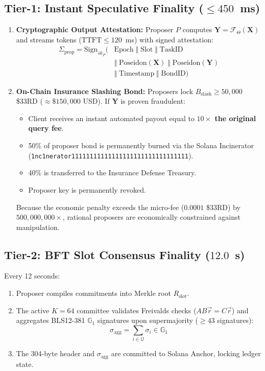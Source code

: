 \documentclass[10pt,twocolumn,letterpaper]{article}
\begin{document}
\subsection{Tier-1: Instant Speculative Finality ($\le 450$~ms)}
\begin{enumerate}
    \item \textbf{Cryptographic Output Attestation:} Proposer $P$ computes $\mathbf{Y} = \mathcal{F}_\Theta(\mathbf{X})$ and streams tokens ($\text{TTFT} \le 120$~ms) with signed attestation:
    \begin{align}
    \Sigma_{\text{prop}} = \text{Sign}_{sk_P}\Big(&\text{Epoch} \;\Vert\; \text{Slot} \;\Vert\; \text{TaskID} \nonumber\\
    &\Vert\; \text{Poseidon}(\mathbf{X}) \;\Vert\; \text{Poseidon}(\mathbf{Y}) \nonumber\\
    &\Vert\; \text{Timestamp} \;\Vert\; \text{BondID}\Big)
    \end{align}
    \item \textbf{On-Chain Insurance Slashing Bond:} Proposers lock $B_{\text{slash}} \ge 50{,}000$ \$33RD ($\approx \$150{,}000$ USD). If $\mathbf{Y}$ is proven fraudulent:
    \begin{itemize}
        \item Client receives an instant automated payout equal to \textbf{$10\times$ the original query fee}.
        \item 50\% of proposer bond is permanently burned via the Solana Incinerator (\texttt{1nc1nerator11111111111111111111111111111111}).
        \item 40\% is transferred to the Insurance Defense Treasury.
        \item Proposer key is permanently revoked.
    \end{itemize}
    Because the economic penalty exceeds the micro-fee ($0.0001$ \$33RD) by \textbf{$500{,}000{,}000\times$}, rational proposers are economically constrained against manipulation.
\end{enumerate}

\subsection{Tier-2: BFT Slot Consensus Finality ($12.0$~s)}
Every 12 seconds:
\begin{enumerate}
    \item Proposer compiles commitments into Merkle root $R_{\text{slot}}$.
    \item The active $K=64$ committee validates Freivalds checks ($AB\vec{r} = C\vec{r}$) and aggregates BLS12-381 $\mathbb{G}_1$ signatures upon supermajority ($\ge 43$ signatures):
    \begin{equation}
    \sigma_{\text{agg}} = \sum_{i \in \mathcal{Q}} \sigma_i \in \mathbb{G}_1
    \end{equation}
    \item The 304-byte header and $\sigma_{\text{agg}}$ are committed to Solana Anchor, locking ledger state.
\end{enumerate}
\end{document}
